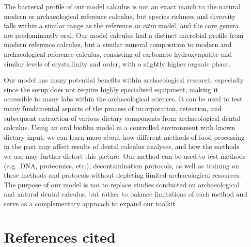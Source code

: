 \documentclass[
  b5paper,
]{book}
\begin{document}
The bacterial profile of our model calculus is not an exact match to the
natural modern or archaeological reference calculus, but species
richness and diversity falls within a similar range as the reference
\emph{in vitro} model, and the core genera are predominantly oral. Our
model calculus had a distinct microbial profile from modern reference
calculus, but a similar mineral composition to modern and archaeological
reference calculus, consisting of carbonate hydroxyapatite and similar
levels of crystallinity and order, with a slightly higher organic phase.

Our model has many potential benefits within archaeological research,
especially since the setup does not require highly specialised
equipment, making it accessible to many labs within the archaeological
sciences. It can be used to test many fundamental aspects of the process
of incorporation, retention, and subsequent extraction of various
dietary components from archaeological dental calculus. Using an oral
biofilm model in a controlled environment with known dietary input, we
can learn more about how different methods of food processing in the
past may affect results of dental calculus analyses, and how the methods
we use may further distort this picture. Our method can be used to test
methods (e.g.~DNA, proteomics, etc.), decontamination protocols, as well
as training on these methods and protocols without depleting limited
archaeological resources. The purpose of our model is not to replace
studies conducted on archaeological and natural dental calculus, but
rather to balance limitations of each method and serve as a
complementary approach to expand our toolkit.

\hypertarget{references-cited-2}{%
\section{References cited}\label{references-cited-2}}
\end{document}
